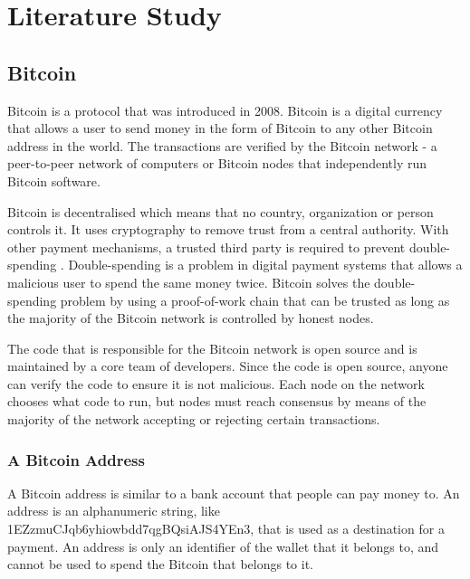 
\chapter{Literature Study}
\label{chp:literature_study}



\section{Bitcoin}

Bitcoin is a protocol that was introduced in 2008\cite{Nakamoto2008}. Bitcoin is a digital currency that allows a user to send money in the form of Bitcoin to any other Bitcoin address in the world. The transactions are verified by the Bitcoin network - a peer-to-peer network of computers or Bitcoin nodes that independently run Bitcoin software. 

Bitcoin is decentralised which means that no country, organization or person controls it. It uses cryptography to remove trust from a central authority. With other payment mechanisms, a trusted third party is required to prevent double-spending \cite{Nakamoto2008}. Double-spending is a problem in digital payment systems that allows a malicious user to spend the same money twice. Bitcoin solves the double-spending problem by using a proof-of-work chain that can be trusted as long as the majority of the Bitcoin network is controlled by honest nodes.

The code that is responsible for the Bitcoin network is open source and is maintained by a core team of developers. Since the code is open source, anyone can verify the code to ensure it is not malicious. Each node on the network chooses what code to run, but nodes must reach consensus by means of the majority of the network accepting or rejecting certain transactions.



\subsection{A Bitcoin Address}

A Bitcoin address is similar to a bank account that people can pay money to. An address is an alphanumeric string, like \\1EZzmuCJqb6yhiowbdd7qgBQsiAJS4YEn3, that is used as a destination for a payment. An address is only an identifier of the wallet that it belongs to, and cannot be used to spend the Bitcoin that belongs to it. 

